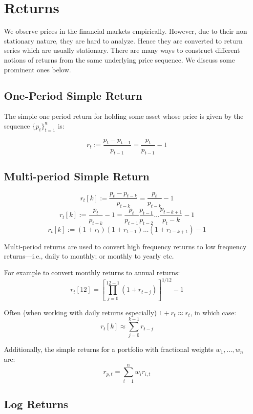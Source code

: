 \documentclass[11pt,]{article}
\begin{document}
\section{Returns}\label{returns}

We observe prices in the financial markets empirically. However, due to
their non-stationary nature, they are hard to analyze. Hence they are
converted to return series which are usually stationary. There are many
ways to construct different notions of returns from the same underlying
price sequence. We discuss some prominent ones below.

\subsection{One-Period Simple Return}\label{one-period-simple-return}

The simple one period return for holding some asset whose price is given
by the sequence \(\{p_t\}_{t=1}^n\) is:

\[r_t := \frac{p_t-p_{t-1}}{p_{t-1}} = \frac{p_t}{p_{t-1}}-1\]

\subsection{Multi-period Simple
Return}\label{multi-period-simple-return}

\[r_t[k] := \frac{p_t-p_{t-k}}{p_{t-k}} = \frac{p_t}{p_{t-k}}-1\]
\[r_t[k] := \frac{p_t}{p_{t-k}}-1 = 
\frac{p_t}{p_{t-1}}\frac{p_{t-1}}{p_{t-2}}\hdots\frac{p_{t-k+1}}{p_t-k}-1\]
\[r_t[k] := (1+r_t)(1+r_{t-1})\hdots(1+r_{t-k+1})-1\]

Multi-period returns are used to convert high frequency returns to low
frequency returns---i.e., daily to monthly; or monthly to yearly etc.

For example to convert monthly returns to annual returns:
\[r_{t}[12]= [\prod_{j=0}^{12-1}(1+r_{t-j})]^{1/12}-1\]

Often (when working with daily returns especially) \(1+r_t\approx r_t\),
in which case: \[r_t[k]\approx \sum_{j=0}^{k-1}r_{t-j}\]

Additionally, the simple returns for a portfolio with fractional weights
\(w_1,\hdots,w_n\) are: \[r_{p,t}=\sum_{i=1}^n w_ir_{i,t}\]

\subsection{Log Returns}\label{log-returns}
\end{document}
